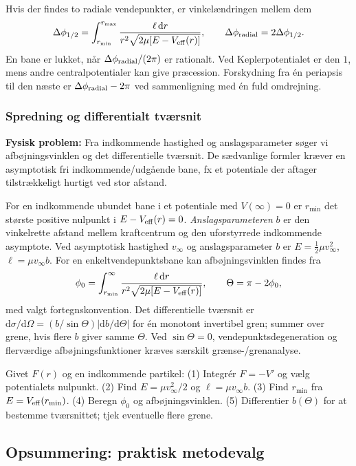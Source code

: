 Hvis der findes to radiale vendepunkter, er vinkelændringen mellem dem
\[\Delta\phi_{1/2}=\int_{r_{\min}}^{r_{\max}}\frac{\ell\,\mathrm dr}{r^2\sqrt{2\mu[E-V_{\rm eff}(r)]}},\qquad\Delta\phi_{\rm radial}=2\Delta\phi_{1/2}.\]
En bane er lukket, når $\Delta\phi_{\rm radial}/(2\pi)$ er rationalt. Ved Keplerpotentialet er den $1$, mens andre centralpotentialer kan give præcession. Forskydning fra én periapsis til den næste er $\Delta\phi_{\rm radial}-2\pi$ ved sammenligning med én fuld omdrejning.

\subsubsection*{Spredning og differentialt tværsnit}
\textbf{Fysisk problem:} Fra indkommende hastighed og anslagsparameter søger vi afbøjningsvinklen og det differentielle tværsnit. De sædvanlige formler kræver en asymptotisk fri indkommende/udgående bane, fx et potentiale der aftager tilstrækkeligt hurtigt ved stor afstand.

For en indkommende ubundet bane i et potentiale med $V(\infty)=0$ er $r_{\min}$ det største positive nulpunkt i $E-V_{\rm eff}(r)=0$. \emph{Anslagsparameteren} $b$ er den vinkelrette afstand mellem kraftcentrum og den uforstyrrede indkommende asymptote.
Ved asymptotisk hastighed $v_\infty$ og anslagsparameter $b$ er $E=\tfrac12\mu v_\infty^2$, $\ell=\mu v_\infty b$. For en enkeltvendepunktsbane kan afbøjningsvinklen findes fra
\[\phi_0=\int_{r_{\min}}^\infty\frac{\ell\,\mathrm dr}{r^2\sqrt{2\mu[E-V_{\rm eff}(r)]}},\qquad\Theta=\pi-2\phi_0,\]
med valgt fortegnskonvention. Det differentielle tværsnit er $\mathrm d\sigma/\mathrm d\Omega=(b/\sin\Theta)|\mathrm db/\mathrm d\Theta|$ for én monotont invertibel gren; summer over grene, hvis flere $b$ giver samme $\Theta$. Ved $\sin\Theta=0$, vendepunktsdegeneration og flerværdige afbøjningsfunktioner kræves særskilt grænse-/grenanalyse.
\begin{method}Givet $F(r)$ og en indkommende partikel: (1) Integrér $F=-V'$ og vælg potentialets nulpunkt. (2) Find $E=\mu v_\infty^2/2$ og $\ell=\mu v_\infty b$. (3) Find $r_{\min}$ fra $E=V_{\rm eff}(r_{\min})$. (4) Beregn $\phi_0$ og afbøjningsvinklen. (5) Differentier $b(\Theta)$ for at bestemme tværsnittet; tjek eventuelle flere grene.\end{method}

\subsection{Opsummering: praktisk metodevalg}


